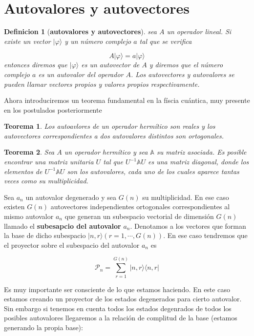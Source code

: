 \documentclass[12pt]{book}
\numberwithin{equation}{chapter}
\numberwithin{figure}{chapter}
\newtheorem{theorem}{Teorema}[section]
\newtheorem{definition}{Definicion}[section]
\begin{document}
\section{Autovalores y autovectores}

\begin{definition}[\textbf{autovalores y autovectores}]
sea $A$ un operador lineal. Si existe un vector $| \varphi \rangle$ y un número complejo $a$ tal que se verifica 

\begin{equation}
A | \varphi \rangle = a | \varphi \rangle
\end{equation}
entonces diremos que $| \varphi \rangle$ es un autovector de $A$ y diremos que el número complejo $a$ es un autovalor del operador $A$. Los autovectores y autovalores se pueden llamar vectores propios y valores propios respectivamente. 
\end{definition}

Ahora introduciremos un teorema fundamental en la físcia cuántica, muy presente en los postulados posteriormente

\begin{theorem}
Los autoavlores de un operador hermítico son reales y los autovectores correspondientes a dos autovalores distintos son ortogonales. 
\end{theorem}

\begin{theorem}
Sea $A$ un operador hermítico y sea $\mathbb{A}$ su matriz asociada. Es posible encontrar una matriz unitaria $U$ tal que $U^{-1} \mathbb{A} U$ es una matriz diagonal, donde los elementos de $U^{-1} \mathbb{A} U$ son los autovalores, cada uno de los cuales aparece tantas veces como su multiplicidad.
\end{theorem}

Sea $a_n$ un autovalor degenerado y sea $G(n)$ su multiplicidad. En ese caso existen $G(n)$ autovectores independientes ortogonales correspondientes al mismo autovalor $a_n$ que generan un subespacio vectorial de dimensión $G(n)$ llamado el \textbf{subesapcio del autovalor} $a_n$. Denotamos a los vectores que forman la base de dicho subespacio $|n,r \rangle (r=1, \cdots, G(n))$. En ese caso tendremos que el proyector sobre el subespacio del autovalor $a_n$ es

\begin{equation}
\mathcal{P}_n = \sum_{r=1}^{G(n)} | n , r \rangle \langle n , r |
\end{equation}

Es muy importante ser consciente de lo que estamos haciendo. En este caso estamos creando un proyector de los estados degenerados para cierto autovalor. Sin embargo si tenemos en cuenta todos los estados degenrados de todos los posibles autovalores llegaremos a la relación de complitud de la base (estamos generando la propia base):
\end{document}
